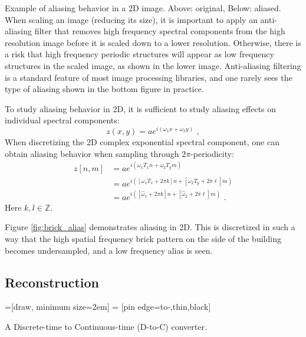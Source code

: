 \begin{marginfigure}
\begin{center}
  \end{center}
  \caption{Example of aliasing behavior in a 2D image. Above: original, Below: aliased. When scaling an image (reducing its size),
    it is important to apply an anti-aliasing filter that removes high frequency spectral components from the
    high resolution image before it is scaled down to a lower resolution. Otherwise, there is a risk that 
    high frequency periodic structures
    will appear as low frequency structures in the scaled image, as shown in the lower image.
    Anti-aliasing filtering is a standard feature of most image processing libraries, and one rarely 
    sees the type of aliasing shown in the bottom figure in practice.}
  \label{fig:brick_alias}
\end{marginfigure}
To study aliasing behavior in 2D, it is sufficient to study aliasing effects on individual spectral components:
\begin{equation}
  z(x,y) = a e^{i (\omega_1 x + \omega_2 y) }\,\,,
\end{equation}
When discretizing the 2D complex exponential spectral component, one can obtain aliasing behavior 
when sampling through $2\pi$-periodicity:
\begin{align}
  z[n,m] & = a e^{i(\omega_1 T_x n + \omega_2 T_y m ) }                                \\
         & =a e^{i([\omega_1 T_x + 2\pi k]n + [\omega_2 T_y + 2\pi \ell]m)}            \\
         & =a e^{i([\hat{\omega}_1 + 2\pi k]n + [\hat{\omega}_{2} + 2\pi \ell]m)}\,\,.
\end{align}
Here $k,l \in \mathbb{Z}$.

Figure \ref{fig:brick_alias} demonstrates aliasing in 2D. This is
discretized in such a way that the high spatial frequency brick
pattern on the side of the building becomes undersampled, and a low
frequency alias is seen.


\subsection{Reconstruction}
\begin{marginfigure}
  =[draw, minimum size=2em]
   = [pin edge={to-,thin,black}]
  \begin{center}
  \end{center}
  \caption{A Discrete-time to Continuous-time (D-to-C) converter.}
\end{marginfigure}

